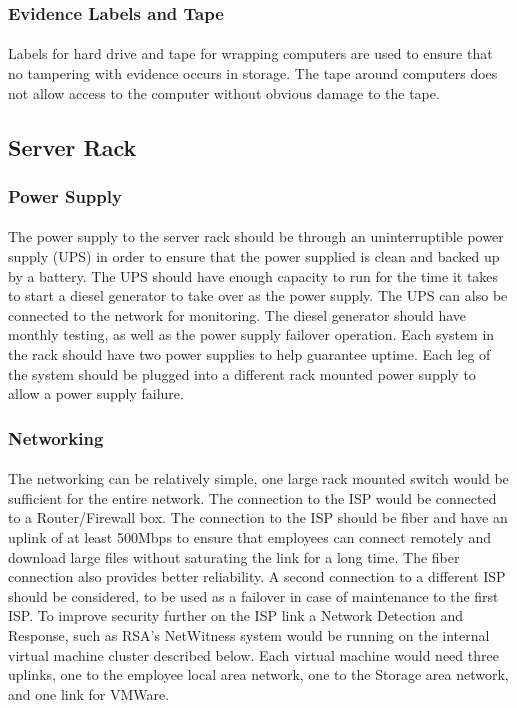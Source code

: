 \documentclass[12pt]{article}
\begin{document}
\subsubsection{Evidence Labels and Tape}
\paragraph{}
Labels for hard drive and tape for wrapping computers are used to ensure that no tampering with evidence occurs in storage. 
The tape around computers does not allow access to the computer without obvious damage to the tape. 
\cite[p.~130]{hayes}
\subsection{Server Rack}
\subsubsection{Power Supply}
\paragraph{}
The power supply to the server rack should be through an uninterruptible power supply (UPS) in order to ensure that the power supplied is clean and backed up by a battery.
The UPS should have enough capacity to run for the time it takes to start a diesel generator to take over as the power supply.
The UPS can also be connected to the network for monitoring.  
The diesel generator should have monthly testing, as well as the power supply failover operation.
Each system in the rack should have two power supplies to help guarantee uptime.
Each leg of the system should be plugged into a different rack mounted power supply to allow a power supply failure.
 
\subsubsection{Networking}
\paragraph{}
The networking can be relatively simple, one large rack mounted switch would be sufficient for the entire network.
The connection to the ISP would be connected to a Router/Firewall box.
The connection to the ISP should be fiber and have an uplink of at least 500Mbps to ensure that employees can connect remotely and download large files without saturating the link for a long time.
The fiber connection also provides better reliability.
A second connection to a different ISP should be considered, to be used as a failover in case of maintenance to the first ISP.
To improve security further on the ISP link a Network Detection and Response, such as RSA's NetWitness system would be running on the internal virtual machine cluster described below.
Each virtual machine would need three uplinks, one to the employee local area network, one to the Storage area network, and one link for VMWare.
\end{document}
